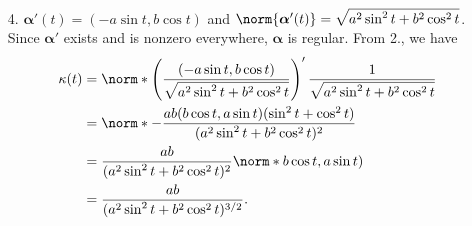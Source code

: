 \documentclass[a4paper,12pt]{article}
\newcommand{\bs}{\boldsymbol}
\theoremstyle{remark}
\begin{document}
\begin{enumerate}
\begin{proof}
\begin{align*}
            \end{align*}
        \end{proof}
        We can now finish the argument:
        \begin{align*}
            \kappa(t) &= %
            \norm{\bs{\beta}''(s)} = \norm{(\bs{\alpha} \circ g)''(s)} \\
            &= \norm{\bs{\alpha}''(g(s)) [g'(s)]^2 + \bs{\alpha}'(g(s)) g''(s)} && \text{Lemma \ref{lem:2nd-deriv-comp}} \\
            &= \norm*{\frac{\bs{\alpha}''(t)}{\norm{\bs{\alpha}'(t)}^2} - \frac{\bs{\alpha}'(t) \norm{\bs{\alpha}'(t)}'}{\norm{\bs{\alpha}'(t)}^3}} && \text{(\ref{eq:g'}) and Lemma \ref{lem:g''}} \\
            &= \norm*{\left( \frac{\norm{\bs{\alpha}'(t)} \bs{\alpha}''(t) - \bs{\alpha}'(t) \norm{\bs{\alpha}'(t)}'}{\norm{\bs{\alpha}'(t)}^2} \right) \frac{1}{\norm{\bs{\alpha}'(t)}}} \\
            &= \norm*{\left( \frac{\bs{\alpha}'(t)}{\norm{\bs{\alpha}'(t)}} \right)' \frac{1}{\norm{\bs{\alpha}'(t)}}}. && \text{Quotient rule}
        \end{align*}

    \item[4.]
        $\bs{\alpha}'(t) = (-a\sin t, b\cos t)$ and $\norm{\bs{\alpha}'(t)} = \sqrt{a^2 \sin^2 t + b^2 \cos^2 t}$. Since $\bs{\alpha}'$ exists and is nonzero everywhere, $\bs{\alpha}$ is regular. From 2., we have
        \begin{align*}
            \kappa(t) &= \norm*{\left( \frac{(-a\sin t, b\cos t)}{\sqrt{a^2 \sin^2 t + b^2 \cos^2 t}} \right)' \frac{1}{\sqrt{a^2 \sin^2 t + b^2 \cos^2 t}}} \\
            &= \norm*{-\frac{ab(b\cos t, a\sin t)(\sin^2 t + \cos^2 t)}{(a^2 \sin^2t + b^2 \cos^2t)^2}} \\
            &= \frac{ab}{(a^2 \sin^2t + b^2 \cos^2t)^2} \norm*{b\cos t, a\sin t)} \\
            &= \frac{ab}{(a^2 \sin^2t + b^2 \cos^2t)^{3/2}}.
        \end{align*}


\end{enumerate}
\end{document}
